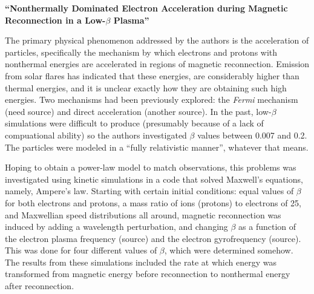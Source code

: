 \documentclass[12pt]{article}
\begin{document}
\begin{center}\large\textbf{
``Nonthermally Dominated Electron Acceleration during Magnetic
Reconnection in a Low-\boldmath$\beta$ Plasma''}
\end{center}
The primary physical phenomenon addressed by the authors is the
acceleration of particles, specifically the mechanism by which
electrons and protons with nonthermal energies are accelerated
in regions of magnetic reconnection.
Emission from solar flares has indicated that
these energies, are considerably higher than thermal energies, and
it is unclear exactly how they are obtaining such high energies.
Two mechanisms had been previously explored:
the \emph{Fermi} mechanism (need source)
and direct acceleration (another source).
In the past, low-$\beta$ simulations were difficult to produce
(presumably because of a lack of compuational ability)
so the authors investigated $\beta$ values between 0.007 and 0.2.
The particles were modeled in a ``fully relativistic manner'',
whatever that means.

Hoping to obtain a power-law model to match observations, this
problems was investigated using kinetic simulations in a code 
that solved Maxwell's
equations, namely, Ampere's law. Starting with certain initial
conditions: equal values of $\beta$ for both electrons and protons, a
mass ratio of ions (protons) to electrons of 25, and Maxwellian speed
distributions all around, magnetic reconnection was induced by adding
a wavelength perturbation, and changing $\beta$ as a function of the
electron plasma frequency (source) and the electron gyrofrequency
(source). This was done for four different values of $\beta$,
which were determined somehow.
The results from these simulations included the rate at which energy
was transformed from magnetic energy before reconnection to nonthermal
energy after reconnection. 
\end{document}
